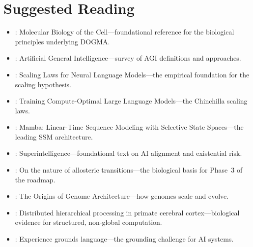 \section*{Suggested Reading}
\begin{itemize}[leftmargin=1.5em]
  \item \citet{alberts2022}: Molecular Biology of the Cell---foundational reference for the biological principles underlying DOGMA.
  \item \citet{goertzel2014}: Artificial General Intelligence---survey of AGI definitions and approaches.
  \item \citet{kaplan2020scaling}: Scaling Laws for Neural Language Models---the empirical foundation for the scaling hypothesis.
  \item \citet{hoffmann2022training}: Training Compute-Optimal Large Language Models---the Chinchilla scaling laws.
  \item \citet{gu2023mamba}: Mamba: Linear-Time Sequence Modeling with Selective State Spaces---the leading SSM architecture.
  \item \citet{bostrom2014superintelligence}: Superintelligence---foundational text on AI alignment and existential risk.
  \item \citet{monod1965}: On the nature of allosteric transitions---the biological basis for Phase~3 of the roadmap.
  \item \citet{lynch2007}: The Origins of Genome Architecture---how genomes scale and evolve.
  \item \citet{felleman1991}: Distributed hierarchical processing in primate cerebral cortex---biological evidence for structured, non-global computation.
  \item \citet{bisk2020}: Experience grounds language---the grounding challenge for AI systems.
\end{itemize}
